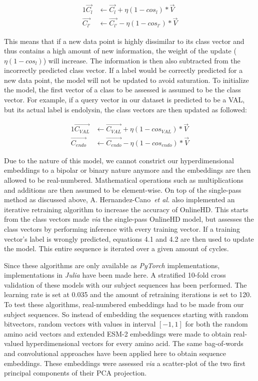 \begin{alignat}{1}
    \label{eqn:onlinehd}
    \vec{C_{l}} &\leftarrow \vec{C_{l}} + \eta (1 - cos_{l}) * \vec{V} \\
    \vec{C_{l'}} &\leftarrow \vec{C_{l'}} - \eta (1 - cos_{l'}) * \vec{V}
\end{alignat}

This means that if a new data point is highly dissimilar to its class vector and thus contains a high amount of new information, the weight of the update ($\eta (1 - cos_{l})$) will increase. The information is then also subtracted from the incorrectly predicted class vector. If a label would be correctly predicted for a new data point, the model will not be updated to avoid saturation. To initialize the model, the first vector of a class to be assessed is assumed to be the class vector. For example, if a query vector in our dataset is predicted to be a VAL, but its actual label is endolysin, the class vectors are then updated as followed:

\begin{alignat}{1}
    \label{eqn:onlinehd2}
    \vec{C_{VAL}} &\leftarrow \vec{C_{VAL}} + \eta (1 - cos_{VAL}) * \vec{V} \\
    \vec{C_{endo}} &\leftarrow \vec{C_{endo}} - \eta (1 - cos_{endo}) * \vec{V}
\end{alignat}

Due to the nature of this model, we cannot constrict our hyperdimensional embeddings to a bipolar or binary nature anymore and the embeddings are then allowed to be real-numbered. Mathematical operations such as multiplications and additions are then assumed to be element-wise. On top of the single-pass method as discussed above, A. Hernandez-Cano~\textit{et al.} also implemented an iterative retraining algorithm to increase the accuracy of OnlineHD. This starts from the class vectors made \textit{via} the single-pass OnlineHD model, but assesses the class vectors by performing inference with every training vector. If a training vector's label is wrongly predicted, equations 4.1 and 4.2 are then used to update the model. This entire sequence is iterated over a given amount of cycles.

Since these algorithms are only available as \textit{PyTorch} implementations, implementations in \textit{Julia} have been made here. A stratified 10-fold cross validation of these models with our subject sequences has been performed. The learning rate is set at 0.035 and the amount of retraining iterations is set to 120. To test these algorithms, real-numbered embeddings had to be made from our subject sequences. So instead of embedding the sequences starting with random bitvectors, random vectors with values in interval $[-1, 1]$ for both the random amino acid vectors and extended ESM-2 embeddings were made to obtain real-valued hyperdimensional vectors for every amino acid. The same bag-of-words and convolutional approaches have been applied here to obtain sequence embeddings. These embeddings were assessed \textit{via} a scatter-plot of the two first principal components of their PCA projection.
